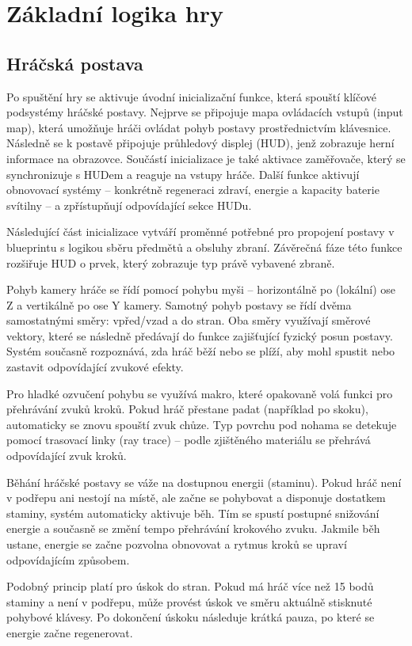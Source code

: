 \section{Základní logika hry}
\subsection{Hráčská postava}
Po spuštění hry se aktivuje úvodní inicializační funkce, která spouští klíčové podsystémy hráčské postavy. Nejprve se připojuje mapa ovládacích vstupů (input map), která umožňuje hráči ovládat pohyb postavy prostřednictvím klávesnice. Následně se k postavě připojuje průhledový displej (HUD), jenž zobrazuje herní informace na obrazovce. Součástí inicializace je také aktivace zaměřovače, který se synchronizuje s HUDem a reaguje na vstupy hráče. Další funkce aktivují obnovovací systémy – konkrétně regeneraci zdraví, energie a kapacity baterie svítilny – a zpřístupňují odpovídající sekce HUDu.

Následující část inicializace vytváří proměnné potřebné pro propojení postavy v blueprintu s logikou sběru předmětů a obsluhy zbraní. Závěrečná fáze této funkce rozšiřuje HUD o prvek, který zobrazuje typ právě vybavené zbraně.

Pohyb kamery hráče se řídí pomocí pohybu myši – horizontálně po (lokální) ose Z a vertikálně po ose Y kamery. Samotný pohyb postavy se řídí dvěma samostatnými směry: vpřed/vzad a do stran. Oba směry využívají směrové vektory, které se následně předávají do funkce zajišťující fyzický posun postavy. Systém současně rozpoznává, zda hráč běží nebo se plíží, aby mohl spustit nebo zastavit odpovídající zvukové efekty.

Pro hladké ozvučení pohybu se využívá makro, které opakovaně volá funkci pro přehrávání zvuků kroků. Pokud hráč přestane padat (například po skoku), automaticky se znovu spouští zvuk chůze. Typ povrchu pod nohama se detekuje pomocí trasovací linky (ray trace) – podle zjištěného materiálu se přehrává odpovídající zvuk kroků.

\newpage

Běhání hráčské postavy se váže na dostupnou energii (staminu). Pokud hráč není v podřepu ani nestojí na místě, ale začne se pohybovat a disponuje dostatkem staminy, systém automaticky aktivuje běh. Tím se spustí postupné snižování energie a současně se změní tempo přehrávání krokového zvuku. Jakmile běh ustane, energie se začne pozvolna obnovovat a rytmus kroků se upraví odpovídajícím způsobem.

Podobný princip platí pro úskok do stran. Pokud má hráč více než 15 bodů staminy a není v podřepu, může provést úskok ve směru aktuálně stisknuté pohybové klávesy. Po dokončení úskoku následuje krátká pauza, po které se energie začne regenerovat.

